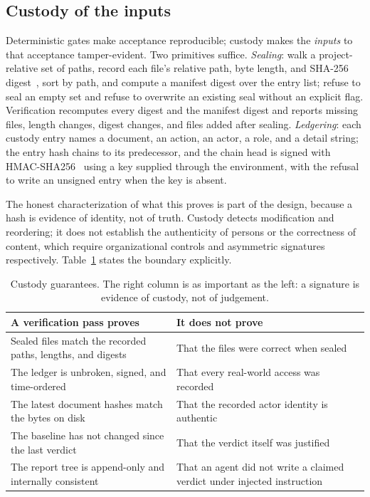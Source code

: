 \documentclass[10pt,a4paper]{article}
\theoremstyle{definition}
\theoremstyle{plain}
\theoremstyle{principle}
\begin{document}
\subsection{Custody of the inputs}

Deterministic gates make acceptance reproducible; custody makes the \emph{inputs} to that
acceptance tamper-evident. Two primitives suffice. \emph{Sealing}: walk a project-relative set of
paths, record each file's relative path, byte length, and SHA-256 digest~\cite{fips180}, sort by
path, and compute a manifest digest over the entry list; refuse to seal an empty set and refuse to
overwrite an existing seal without an explicit flag. Verification recomputes every digest and the
manifest digest and reports missing files, length changes, digest changes, and files added after
sealing. \emph{Ledgering}: each custody entry names a document, an action, an actor, a role, and a
detail string; the entry hash chains to its predecessor, and the chain head is signed with
HMAC-SHA256~\cite{hmac} using a key supplied through the environment, with the refusal to write an
unsigned entry when the key is absent.

The honest characterization of what this proves is part of the design, because a hash is evidence
of identity, not of truth. Custody detects modification and reordering; it does not establish the
authenticity of persons or the correctness of content, which require organizational controls and
asymmetric signatures respectively. Table~\ref{tab:custody} states the boundary explicitly.

\begin{table}[htbp]
\centering
\caption{Custody guarantees. The right column is as important as the left: a signature is evidence
of custody, not of judgement.}
\label{tab:custody}
\small
\begin{tabularx}{\textwidth}{@{}>{\raggedright\arraybackslash}X >{\raggedright\arraybackslash}X@{}}
\toprule
\textbf{A verification pass proves} & \textbf{It does not prove} \\
\midrule
Sealed files match the recorded paths, lengths, and digests & That the files were correct when sealed \\
The ledger is unbroken, signed, and time-ordered & That every real-world access was recorded \\
The latest document hashes match the bytes on disk & That the recorded actor identity is authentic \\
The baseline has not changed since the last verdict & That the verdict itself was justified \\
The report tree is append-only and internally consistent & That an agent did not write a claimed verdict under injected instruction \\
\bottomrule
\end{tabularx}
\end{table}
\end{document}
